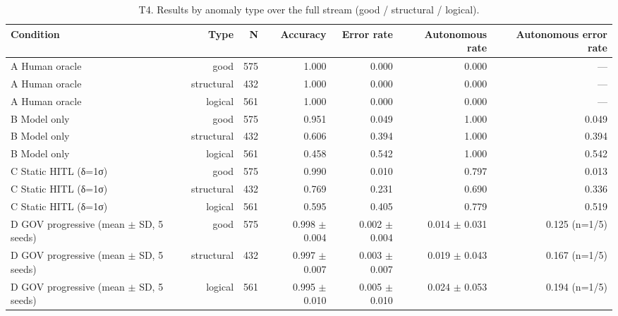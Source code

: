\begin{table}[t]\centering\small
\caption{T4. Results by anomaly type over the full stream (good / structural / logical).}
\label{tab:T4_by_anomaly_type}
\begin{tabular}{lrrrrrr}\hline
Condition & Type & N & Accuracy & Error rate & Autonomous rate & Autonomous error rate \\ \hline
A Human oracle & good & 575 & 1.000 & 0.000 & 0.000 & — \\
A Human oracle & structural & 432 & 1.000 & 0.000 & 0.000 & — \\
A Human oracle & logical & 561 & 1.000 & 0.000 & 0.000 & — \\
B Model only & good & 575 & 0.951 & 0.049 & 1.000 & 0.049 \\
B Model only & structural & 432 & 0.606 & 0.394 & 1.000 & 0.394 \\
B Model only & logical & 561 & 0.458 & 0.542 & 1.000 & 0.542 \\
C Static HITL (δ=1σ) & good & 575 & 0.990 & 0.010 & 0.797 & 0.013 \\
C Static HITL (δ=1σ) & structural & 432 & 0.769 & 0.231 & 0.690 & 0.336 \\
C Static HITL (δ=1σ) & logical & 561 & 0.595 & 0.405 & 0.779 & 0.519 \\
D GOV progressive (mean $\pm$ SD, 5 seeds) & good & 575 & 0.998 $\pm$ 0.004 & 0.002 $\pm$ 0.004 & 0.014 $\pm$ 0.031 & 0.125 (n=1/5) \\
D GOV progressive (mean $\pm$ SD, 5 seeds) & structural & 432 & 0.997 $\pm$ 0.007 & 0.003 $\pm$ 0.007 & 0.019 $\pm$ 0.043 & 0.167 (n=1/5) \\
D GOV progressive (mean $\pm$ SD, 5 seeds) & logical & 561 & 0.995 $\pm$ 0.010 & 0.005 $\pm$ 0.010 & 0.024 $\pm$ 0.053 & 0.194 (n=1/5) \\
\hline\end{tabular}
\end{table}
